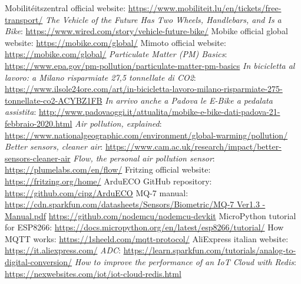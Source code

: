 \begin{thebibliography}{00}
	
 Mobilitéitszentral official website:  \url{https://www.mobiliteit.lu/en/tickets/free-transport/}
 \textit{The Vehicle of the Future Has Two Wheels, Handlebars, and Is a Bike}:  \url{https://www.wired.com/story/vehicle-future-bike/}
 Mobike official global website: \url{https://mobike.com/global/}
 Mimoto official website: \url{https://mobike.com/global/}
 \textit{Particulate Matter (PM) Basics}: \href{https://www.epa.gov/pm-pollution/particulate-matter-pm-basics}{https://www.epa.gov/pm-pollution/particulate-matter-pm-basics}
 \textit{In bicicletta al lavoro: a Milano risparmiate 27,5 tonnellate di CO2}:  \url{https://www.ilsole24ore.com/art/in-bicicletta-lavoro-milano-risparmiate-275-tonnellate-co2-ACYBZ1FB}
 \textit{In arrivo anche a Padova le E-Bike a pedalata assistita}: \href{http://www.padovaoggi.it/attualita/mobike-e-bike-dati-padova-21-febbraio-2020.html}{http://www.padovaoggi.it/attualita/mobike-e-bike-dati-padova-21-febbraio-2020.html}
 \textit{Air pollution, explained}: \href{https://www.nationalgeographic.com/environment/global-warming/pollution/}{https://www.nationalgeographic.com/environment/global-warming/pollution/}
 \textit{Better sensors, cleaner air}: \href{https://www.cam.ac.uk/research/impact/better-sensors-cleaner-air}{https://www.cam.ac.uk/research/impact/better-sensors-cleaner-air}
 \textit{Flow, the personal air pollution sensor}: \href{https://plumelabs.com/en/flow/}{https://plumelabs.com/en/flow/}
 Fritzing official website: \href{https://fritzing.org/home/}{https://fritzing.org/home/}
 ArduECO GitHub repository:  \href{https://github.com/cipz/ArduECO}{https://github.com/cipz/ArduECO}
 MQ-7 manual: \href{https://cdn.sparkfun.com/datasheets/Sensors/Biometric/MQ-7 Ver1.3 - Manual.pdf}{https://cdn.sparkfun.com/datasheets/Sensors/Biometric/MQ-7 Ver1.3 - Manual.pdf}
 \href{https://github.com/nodemcu/nodemcu-devkit}{https://github.com/nodemcu/nodemcu-devkit}
 MicroPython tutorial for ESP8266: \url{https://docs.micropython.org/en/latest/esp8266/tutorial/}
 How MQTT works:  \href{https://1sheeld.com/mqtt-protocol/}{https://1sheeld.com/mqtt-protocol/}
 AliExpress italian website: \href{https://it.aliexpress.com/}{https://it.aliexpress.com/}
 \textit{ADC}:  \url{https://learn.sparkfun.com/tutorials/analog-to-digital-conversion/}
 \textit{How to improve the performance of an IoT Cloud with Redis}: \href{https://nexwebsites.com/iot/iot-cloud-redis.html}{https://nexwebsites.com/iot/iot-cloud-redis.html}



\end{thebibliography}

